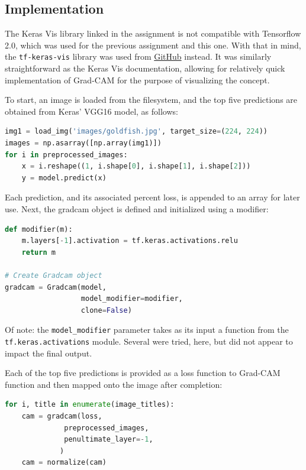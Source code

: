 \documentclass{article}
\begin{document}
\subsection{Implementation} \label{impl}
\par The Keras Vis library linked in the assignment is not compatible with Tensorflow 2.0, which was used for the previous assignment and this one.
With that in mind, the \lstinline{tf-keras-vis} library was used from \href{https://github.com/keisen/tf-keras-vis}{GitHub} instead.
It was similarly straightforward as the Keras Vis documentation, allowing for relatively quick implementation of Grad-CAM for the purpose of visualizing the concept.
\par To start, an image is loaded from the filesystem, and the top five predictions are obtained from Keras' VGG16 model, as follows:

\begin{lstlisting}[language=Python]
img1 = load_img('images/goldfish.jpg', target_size=(224, 224))
images = np.asarray([np.array(img1)])
for i in preprocessed_images:
    x = i.reshape((1, i.shape[0], i.shape[1], i.shape[2]))
    y = model.predict(x)
\end{lstlisting}

\par Each prediction, and its associated percent loss, is appended to an array for later use. Next, the gradcam object is defined and initialized using a modifier:

\begin{lstlisting}[language=Python]
def modifier(m):
    m.layers[-1].activation = tf.keras.activations.relu
    return m

# Create Gradcam object
gradcam = Gradcam(model,
                  model_modifier=modifier,
                  clone=False)
\end{lstlisting}

\par Of note: the \lstinline{model_modifier} parameter takes as its input a function from the \lstinline{tf.keras.activations} module.
Several were tried, here, but did not appear to impact the final output.

\par Each of the top five predictions is provided as a loss function to Grad-CAM function and then mapped onto the image after completion:

\begin{lstlisting}[language=Python]
for i, title in enumerate(image_titles):
    cam = gradcam(loss,
              preprocessed_images,
              penultimate_layer=-1,
             )
    cam = normalize(cam)
\end{lstlisting}
\end{document}
